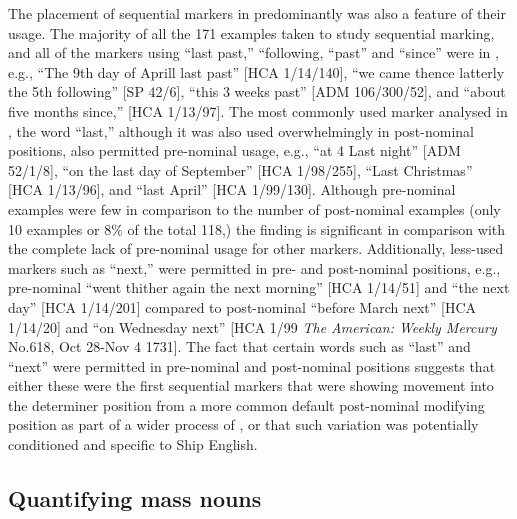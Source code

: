 The placement of sequential markers in predominantly  was also a feature of their usage. The majority of all the 171 examples taken to study sequential marking, and all of the markers using “last past,” “following, “past” and “since” were in , e.g., “The 9th day of Aprill last past” [HCA 1/14/140], “we came thence latterly the 5th following” [SP 42/6], “this 3 weeks past” [ADM 106/300/52], and “about five months since,” [HCA 1/13/97]. The most commonly used marker analysed in , the word “last,” although it was also used overwhelmingly in post-nominal positions, also permitted pre-nominal usage, e.g., “at 4 Last night” [ADM 52/1/8], “on the last day of September” [HCA 1/98/255], “Last Christmas” [HCA 1/13/96], and “last April” [HCA 1/99/130]. Although pre-nominal examples were few in comparison to the number of post-nominal examples (only 10 examples or 8\% of the total 118,) the finding is significant in comparison with the complete lack of pre-nominal usage for other markers. Additionally, less-used markers such as “next,” were permitted in pre- and post-nominal positions, e.g., pre-nominal “went thither again the next morning” [HCA 1/14/51] and “the next day” [HCA 1/14/201] compared to post-nominal “before March next” [HCA 1/14/20] and “on Wednesday next” [HCA 1/99 \textit{The American: Weekly Mercury} No.618, Oct 28-Nov 4 1731]. The fact that certain words such as “last” and “next” were permitted in pre-nominal and post-nominal positions suggests that either these were the first sequential markers that were showing movement into the determiner position from a more common default post-nominal modifying position as part of a wider process of , or that such variation was potentially conditioned and specific to Ship English. 

\subsection{{Quantifying mass nouns}}\label{sec:5.3.4}

